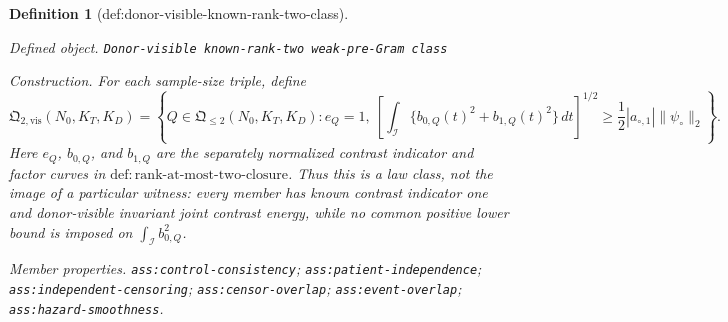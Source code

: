 \documentclass{article}
\newtheorem{definition}{Definition}
\begin{document}
\begin{definition}[def:donor-visible-known-rank-two-class]\label{def:donor-visible-known-rank-two-class}
\par\smallskip\noindent\emph{Defined object.} \texttt{Donor-\allowbreak{}visible known-\allowbreak{}rank-\allowbreak{}two weak-\allowbreak{}pre-\allowbreak{}Gram class}
\par\smallskip\noindent\emph{Construction.} For each sample-size triple, define
\[
 \mathfrak Q_{2,\mathrm{vis}}(N_0,K_T,K_D)
 =\left\{Q\in\mathfrak Q_{\leq2}(N_0,K_T,K_D):
 e_Q=1,\ 
 \left[\int_{\mathcal I}\{b_{0,Q}(t)^2+b_{1,Q}(t)^2\}\,dt\right]^{1/2}
 \ge \frac12|a_{\circ,1}|\|\psi_\circ\|_2\right\}.
\]
Here \(e_Q\), \(b_{0,Q}\), and \(b_{1,Q}\) are the separately normalized contrast indicator and factor curves in \(\mathrm{def:rank\mbox{-}at\mbox{-}most\mbox{-}two\mbox{-}closure}\).  Thus this is a law class, not the image of a particular witness: every member has known contrast indicator one and donor-visible invariant joint contrast energy, while no common positive lower bound is imposed on \(\int_{\mathcal I}b_{0,Q}^2\).
\par\smallskip\noindent\emph{Member properties.} \texttt{ass:\allowbreak{}control-\allowbreak{}consistency}; \texttt{ass:\allowbreak{}patient-\allowbreak{}independence}; \texttt{ass:\allowbreak{}independent-\allowbreak{}censoring}; \texttt{ass:\allowbreak{}censor-\allowbreak{}overlap}; \texttt{ass:\allowbreak{}event-\allowbreak{}overlap}; \texttt{ass:\allowbreak{}hazard-\allowbreak{}smoothness}.
\end{definition}
\end{document}
